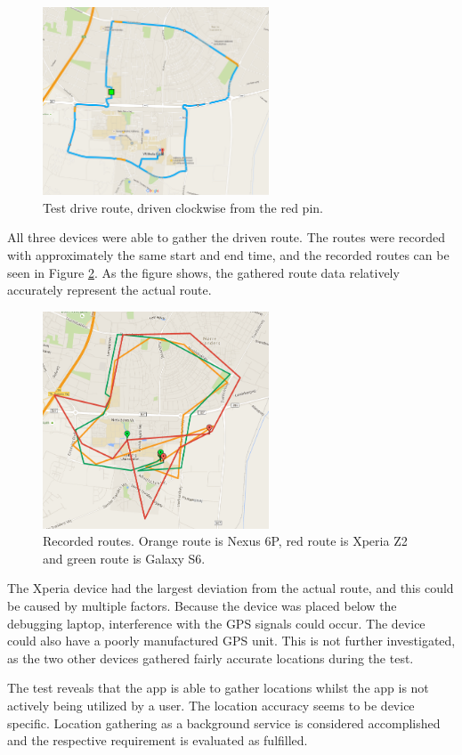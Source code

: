 \begin{figure}[h]
	\centering
	\includegraphics[width=0.6\textwidth]{figures/testroute.png}
	\caption{Test drive route, driven clockwise from the red pin.}
	\label{fig:testroute}
\end{figure}


All three devices were able to gather the driven route. 
The routes were recorded with approximately the same start and end time, and the recorded routes can be seen in Figure \ref{fig:testrouterecordings}. 
As the figure shows, the gathered route data relatively accurately represent the actual route.

\begin{figure}[h]
	\centering
	\includegraphics[width=0.6\textwidth]{figures/testRouteRecordings.png}
	\caption{Recorded routes. Orange route is Nexus 6P, red route is Xperia Z2 and green route is Galaxy S6.}
	\label{fig:testrouterecordings}
\end{figure}

The Xperia device had the largest deviation from the actual route, and this could be caused by multiple factors.
Because the device was placed below the debugging laptop, interference with the GPS signals could occur.
The device could also have a poorly manufactured GPS unit.
This is not further investigated, as the two other devices gathered fairly accurate locations during the test.



The test reveals that the app is able to gather locations whilst the app is not actively being utilized by a user.
The location accuracy seems to be device specific.
Location gathering as a background service is considered accomplished and the respective requirement is evaluated as fulfilled.

